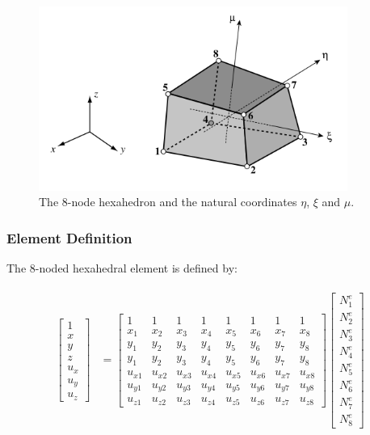 \documentclass[10pt,b5paper,titlepage]{book}
\newenvironment{eqarray}
{
    \begin{eqnarray}
        \begin{aligned}
}
{
        \end{aligned}
    \end{eqnarray}
}
\begin{document}
\begin{figure}[ht]
    \centering
    \includegraphics[width=0.90\textwidth]{img/hex8-node-numbers.png}
    \caption{The 8-node hexahedron and the natural coordinates $ \eta $, $ \xi $
    and $ \mu $.}
    \label{fig:hex8-node-numbers-png}
\end{figure}


\subsubsection{Element Definition}

The 8-noded hexahedral element is defined by:

\begin{eqarray}
    \begin{bmatrix}
        1\\
        x\\
        y\\
        z\\
        u_x\\
        u_y\\
        u_z
    \end{bmatrix} &=
    \begin{bmatrix}
        1 & 1 & 1 & 1 & 1 & 1 & 1 & 1\\
        x_1 & x_2 & x_3 & x_4 & x_5 & x_6 & x_7 & x_8\\
        y_1 & y_2 & y_3 & y_4 & y_5 & y_6 & y_7 & y_8\\
        y_1 & y_2 & y_3 & y_4 & y_5 & y_6 & y_7 & y_8\\
        u_{x1} & u_{x2} & u_{x3} & u_{x4} & u_{x5} & u_{x6} & u_{x7} & u_{x8}\\
        u_{y1} & u_{y2} & u_{y3} & u_{y4} & u_{y5} & u_{y6} & u_{y7} & u_{y8}\\
        u_{z1} & u_{z2} & u_{z3} & u_{z4} & u_{z5} & u_{z6} & u_{z7} & u_{z8}
    \end{bmatrix}
    \begin{bmatrix}
        N_1^e\\
        N_2^e\\
        N_3^e\\
        N_4^e\\
        N_5^e\\
        N_6^e\\
        N_7^e\\
        N_8^e
    \end{bmatrix}
\end{eqarray}
\end{document}
